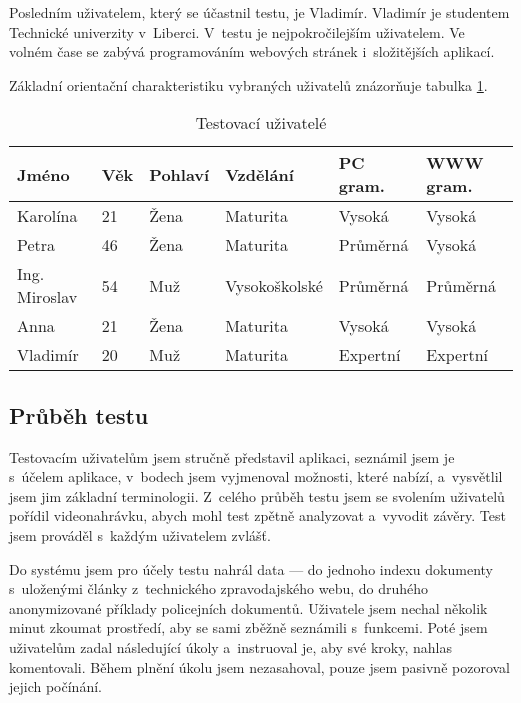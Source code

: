 Posledním uživatelem, který se účastnil testu, je Vladimír. Vladimír je studentem Technické univerzity v~Liberci. V~testu je nejpokročilejším uživatelem. Ve volném čase se zabývá programováním webových stránek i~složitějších aplikací.

Základní orientační charakteristiku vybraných uživatelů znázorňuje tabulka \ref{tab:test_usrs}.

\begin{table}
\begin{center}
\begin{tabular}{|l|l|l|l|l|l|}
\hline
\textbf{Jméno} & \textbf{Věk} & \textbf{Pohlaví} & \textbf{Vzdělání} & \textbf{PC gram.} & \textbf{WWW gram.} \\ \hline
Karolína & 21 & Žena & Maturita & Vysoká & Vysoká \\ \hline
Petra & 46 & Žena & Maturita & Průměrná & Vysoká \\ \hline
Ing. Miroslav & 54 & Muž & Vysokoškolské & Průměrná & Průměrná \\ \hline
Anna & 21 & Žena & Maturita & Vysoká & Vysoká \\ \hline
Vladimír & 20 & Muž & Maturita & Expertní & Expertní \\ \hline
\end{tabular}
\end{center}
\caption{Testovací uživatelé}
\label{tab:test_usrs}
\end{table}

\subsection{Průběh testu}
Testovacím uživatelům jsem stručně představil aplikaci, seznámil jsem je s~účelem aplikace, v~bodech jsem vyjmenoval možnosti, které nabízí, a~vysvětlil jsem jim základní terminologii. Z~celého průběh testu jsem se svolením uživatelů pořídil videonahrávku, abych mohl test zpětně analyzovat a~vyvodit závěry. Test jsem prováděl s~každým uživatelem zvlášť.

Do systému jsem pro účely testu nahrál data --- do jednoho indexu dokumenty s~uloženými články z~technického zpravodajského webu, do druhého anonymizované příklady policejních dokumentů. Uživatele jsem nechal několik minut zkoumat prostředí, aby se sami zběžně seznámili s~funkcemi. Poté jsem uživatelům zadal následující úkoly a~instruoval je, aby své kroky, nahlas komentovali. Během plnění úkolu jsem nezasahoval, pouze jsem pasivně pozoroval jejich počínání.

